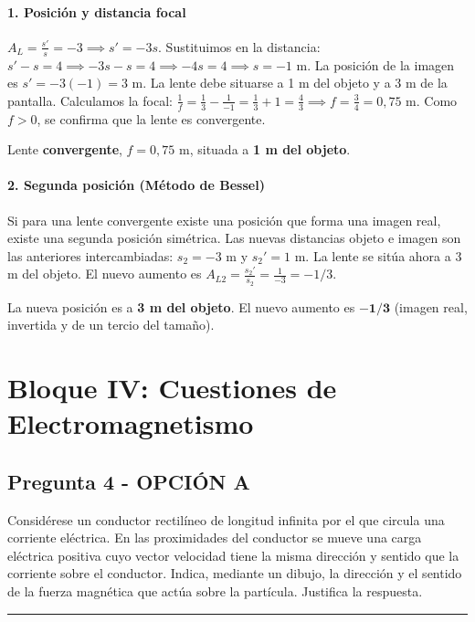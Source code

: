 \paragraph*{1. Posición y distancia focal}
$A_L = \frac{s'}{s} = -3 \implies s' = -3s$.
Sustituimos en la distancia: $s' - s = 4 \implies -3s - s = 4 \implies -4s = 4 \implies s = -1$ m.
La posición de la imagen es $s' = -3(-1) = 3$ m.
La lente debe situarse a 1 m del objeto y a 3 m de la pantalla.
Calculamos la focal: $\frac{1}{f} = \frac{1}{3} - \frac{1}{-1} = \frac{1}{3} + 1 = \frac{4}{3} \implies f = \frac{3}{4} = 0,75$ m.
Como $f>0$, se confirma que la lente es convergente.
\begin{cajaresultado}
    Lente \textbf{convergente}, $f=0,75$ m, situada a \textbf{1 m del objeto}.
\end{cajaresultado}

\paragraph*{2. Segunda posición (Método de Bessel)}
Si para una lente convergente existe una posición que forma una imagen real, existe una segunda posición simétrica. Las nuevas distancias objeto e imagen son las anteriores intercambiadas: $s_2 = -3$ m y $s_2' = 1$ m.
La lente se sitúa ahora a 3 m del objeto.
El nuevo aumento es $A_{L2} = \frac{s_2'}{s_2} = \frac{1}{-3} = -1/3$.
\begin{cajaresultado}
    La nueva posición es a \textbf{3 m del objeto}. El nuevo aumento es $\boldsymbol{-1/3}$ (imagen real, invertida y de un tercio del tamaño).
\end{cajaresultado}

\newpage

\section{Bloque IV: Cuestiones de Electromagnetismo}
\label{sec:em_2004_jun_ord}

\subsection{Pregunta 4 - OPCIÓN A}
\label{subsec:4A_2004_jun_ord}

\begin{cajaenunciado}
Considérese un conductor rectilíneo de longitud infinita por el que circula una corriente eléctrica. En las proximidades del conductor se mueve una carga eléctrica positiva cuyo vector velocidad tiene la misma dirección y sentido que la corriente sobre el conductor. Indica, mediante un dibujo, la dirección y el sentido de la fuerza magnética que actúa sobre la partícula. Justifica la respuesta.
\end{cajaenunciado}
\hrule

